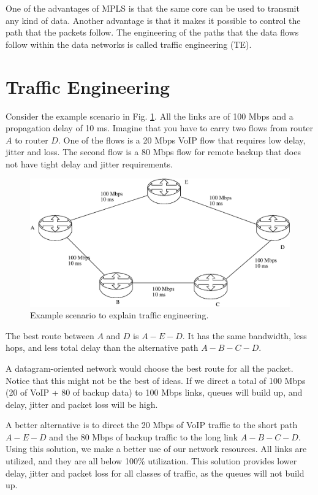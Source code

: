 One of the advantages of MPLS is that the same core can be used to transmit any kind of data.
Another advantage is that it makes it possible to control the path that the packets follow.
The engineering of the paths that the data flows follow within the data networks is called traffic engineering (TE).

\section{Traffic Engineering}

Consider the example scenario in Fig. \ref{fig:traffic-engineering}.
All the links are of 100 Mbps and a propagation delay of 10 ms.
Imagine that you have to carry two flows from router $A$ to router $D$.
One of the flows is a 20 Mbps VoIP flow that requires low delay, jitter and loss.
The second flow is a 80 Mbps flow for remote backup that does not have tight delay and jitter requirements.

\begin{figure}[!h]
\centering
\includegraphics[width=\linewidth]{figures/traffic-engineering.eps}
\caption{Example scenario to explain traffic engineering.}
\label{fig:traffic-engineering}
\end{figure}

The best route between $A$ and $D$ is $A-E-D$.
It has the same bandwidth, less hops, and less total delay than the alternative path $A-B-C-D$.

A datagram-oriented network would choose the best route for all the packet.
Notice that this might not be the best of ideas.
If we direct a total of 100 Mbps (20 of VoIP + 80 of backup data) to 100 Mbps links, queues will build up, and delay, jitter and packet loss will be high.

A better alternative is to direct the 20 Mbps of VoIP traffic to the short path $A-E-D$ and the 80 Mbps of backup traffic to the long link $A-B-C-D$.
Using this solution, we make a better use of our network resources.
All links are utilized, and they are all below 100\% utilization.
This solution provides lower delay, jitter and packet loss for all classes of traffic, as the queues will not build up.

